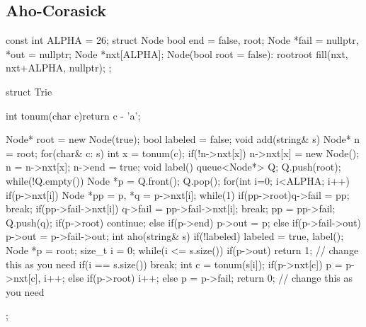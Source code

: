 \subsection{Aho-Corasick}
\begin{cpp}
const int ALPHA = 26;
struct Node{
  bool end = false, root;
  Node *fail = nullptr, *out = nullptr;
  Node *nxt[ALPHA]; 
  Node(bool root = false): root{root}
    {fill(nxt, nxt+ALPHA, nullptr);}
};

struct Trie{
  int tonum(char c){return c - 'a';}
  
  Node* root = new Node(true);
  bool labeled = false;
  void add(string& s){
    Node* n = root;
    for(char& c: s){
      int x = tonum(c);
      if(!n->nxt[x]) n->nxt[x] = new Node();
      n = n->nxt[x];
    }
    n->end = true;
  }
  void label(){
    queue<Node*> Q; Q.push(root);
    while(!Q.empty()){
      Node *p = Q.front(); Q.pop();
      for(int i=0; i<ALPHA; i++) if(p->nxt[i]){
        Node *pp = p, *q = p->nxt[i];
        while(1){
          if(pp->root){q->fail = pp; break;}
          if(pp->fail->nxt[i])
            {q->fail = pp->fail->nxt[i]; break;}
          pp = pp->fail;
        }
        Q.push(q);
      }
      if(p->root) continue;
      else if(p->end) p->out = p;
      else if(p->fail->out) p->out = p->fail->out;
    }
  }
  int aho(string& s){
    if(!labeled) labeled = true, label();
    Node *p = root; size_t i = 0;
    while(i <= s.size()){
      if(p->out) return 1; // change this as you need
      if(i == s.size()) break;
      int c = tonum(s[i]);
      if(p->nxt[c]) p = p->nxt[c], i++;
      else if(p->root) i++;
      else p = p->fail;
    }
    return 0; // change this as you need
  }
};
\end{cpp}

